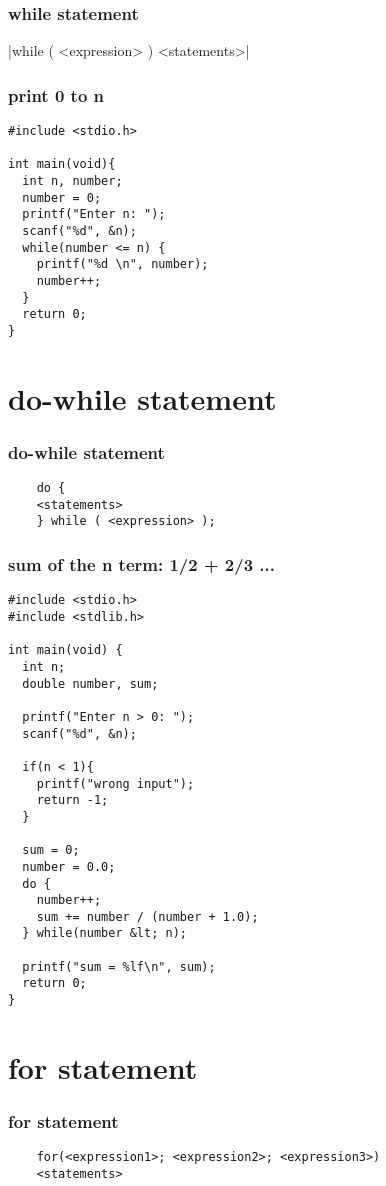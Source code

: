 \documentclass{../c-lecture}
\begin{document}
\begin{frame}
  \frametitle{while statement}
  |while ( <expression> ) <statements>|
\end{frame}

\begin{frame}[fragile]
  \frametitle{print 0 to n}
  \begin{verbatim}
#include <stdio.h>

int main(void){
  int n, number;
  number = 0;
  printf("Enter n: ");
  scanf("%d", &n);
  while(number <= n) {
    printf("%d \n", number);
    number++;
  }
  return 0;
}
  \end{verbatim}
\end{frame}

\section{do-while statement}

\begin{frame}[fragile]
  \frametitle{do-while statement}
  \begin{verbatim}
    do {
    <statements>
    } while ( <expression> );
  \end{verbatim}
\end{frame}

\begin{frame}[fragile]
  \frametitle{sum of the n term: 1/2 + 2/3 ...}
  \begin{verbatim}
#include <stdio.h>
#include <stdlib.h>

int main(void) {
  int n;
  double number, sum;

  printf("Enter n > 0: ");
  scanf("%d", &n);

  if(n < 1){
    printf("wrong input");
    return -1;
  }

  sum = 0;
  number = 0.0;
  do {
    number++;
    sum += number / (number + 1.0);
  } while(number &lt; n);

  printf("sum = %lf\n", sum);
  return 0;
}
  \end{verbatim}
\end{frame}

\section{for statement}

\begin{frame}[fragile]
  \frametitle{for statement}
  \begin{verbatim}
    for(<expression1>; <expression2>; <expression3>)
    <statements>
  \end{verbatim}
\end{frame}
\end{document}
